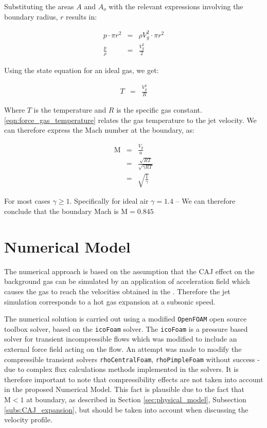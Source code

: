 \documentclass[a4paper]{iacas}%
\begin{document}
Substituting the areas $A$ and $A_o$ with the relevant expressions involving the boundary radius, $r$ results in: 

\begin{eqnarray}\label{eqn:force_gas_ratio}
p \cdot \pi r^2 &=& \rho V^2_g \cdot \pi r^2 \\
\frac{p}{\rho} &=& \frac{V^2_g}{2}
\end{eqnarray}

Using the state equation for an ideal gas, we get:

\begin{eqnarray}\label{eqn:force_gas_temperature}
	T &=& \frac{V^2_g}{R}
\end{eqnarray}

Where $T$ is the temperature and $R$ is the specific gas constant. \eqref{eqn:force_gas_temperature} relates the gas temperature to the jet velocity. We can therefore express the Mach number at the boundary, as:

\begin{eqnarray}
	\mathrm{M} &=& \frac{V_g}{a} \\
	 &=& \frac{\sqrt{RT}}{\sqrt{\gamma R T}}\\\label{eqn:mach}
	 &=& \sqrt{\frac{1}{\gamma}}
\end{eqnarray}

For most cases $\gamma \geq 1$. Specifically for ideal air $\gamma = 1.4$ -- We can therefore conclude that the boundary Mach is $\mathrm{M} = 0.845$

\section{Numerical Model}

The numerical approach is based on the assumption that the CAJ effect on the background gas can be simulated by an application of acceleration field which causes the gas to reach the velocities obtained in the \cite{KR}. Therefore the jet simulation corresponds to a hot gas expansion at a subsonic speed.

The numerical solution is carried out using a modified \texttt{OpenFOAM} \cite{OPENFOAM} open source toolbox solver, based on the \texttt{icoFoam} solver. The \texttt{icoFoam} is a pressure based solver for transient incompressible flows which was modified to include an external force field acting on the flow. An attempt was made to modify the compressible transient solvers \texttt{rhoCentralFoam}, \texttt{rhoPimpleFoam} without success - due to complex flux calculations methods implemented in the solvers. It is therefore important to note that compressibility effects are not taken into account in the proposed Numerical Model. This fact is plausible due to the fact that $\mathrm{M} < 1$ at boundary, as described in Section \ref{sec:physical_model}, Subsection \ref{subs:CAJ_expansion}, but should be taken into account when discussing the velocity profile.
\end{document}

